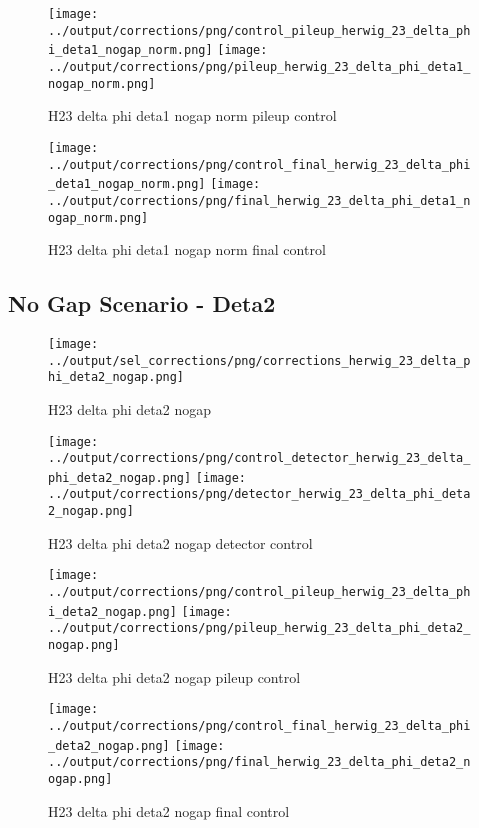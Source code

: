 \documentclass[11pt]{book}
\begin{document}
\begin{figure}[ht]
\centering
\texttt{[image: ../output/corrections/png/control\_pileup\_herwig\_23\_delta\_phi\_deta1\_nogap\_norm.png]}
\texttt{[image: ../output/corrections/png/pileup\_herwig\_23\_delta\_phi\_deta1\_nogap\_norm.png]}
\caption{H23 delta phi deta1 nogap norm pileup control}
\label{fig:H23_delta_phi_deta1_nogap_norm_pileup_control}
\end{figure}


\begin{figure}[ht]
\centering
\texttt{[image: ../output/corrections/png/control\_final\_herwig\_23\_delta\_phi\_deta1\_nogap\_norm.png]}
\texttt{[image: ../output/corrections/png/final\_herwig\_23\_delta\_phi\_deta1\_nogap\_norm.png]}
\caption{H23 delta phi deta1 nogap norm final control}
\label{fig:H23_delta_phi_deta1_nogap_norm_final_control}
\end{figure}

\clearpage
\subsection{No Gap Scenario - Deta2}
\begin{figure}[ht]
\centering
\texttt{[image: ../output/sel\_corrections/png/corrections\_herwig\_23\_delta\_phi\_deta2\_nogap.png]}
\caption{H23 delta phi deta2 nogap}
\label{fig:H23_delta_phi_deta2_nogap}
\end{figure}

\begin{figure}[ht]
\centering
\texttt{[image: ../output/corrections/png/control\_detector\_herwig\_23\_delta\_phi\_deta2\_nogap.png]}
\texttt{[image: ../output/corrections/png/detector\_herwig\_23\_delta\_phi\_deta2\_nogap.png]}
\caption{H23 delta phi deta2 nogap detector control}
\label{fig:H23_delta_phi_deta2_nogap_detector_control}
\end{figure}

\begin{figure}[ht]
\centering
\texttt{[image: ../output/corrections/png/control\_pileup\_herwig\_23\_delta\_phi\_deta2\_nogap.png]}
\texttt{[image: ../output/corrections/png/pileup\_herwig\_23\_delta\_phi\_deta2\_nogap.png]}
\caption{H23 delta phi deta2 nogap pileup control}
\label{fig:H23_delta_phi_deta2_nogap_pileup_control}
\end{figure}


\begin{figure}[ht]
\centering
\texttt{[image: ../output/corrections/png/control\_final\_herwig\_23\_delta\_phi\_deta2\_nogap.png]}
\texttt{[image: ../output/corrections/png/final\_herwig\_23\_delta\_phi\_deta2\_nogap.png]}
\caption{H23 delta phi deta2 nogap final control}
\label{fig:H23_delta_phi_deta2_nogap_final_control}
\end{figure}
\end{document}
